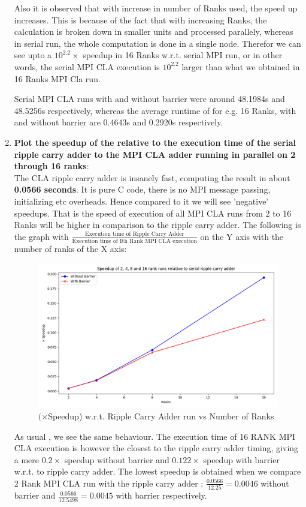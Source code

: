 \documentclass[a4paper,12 pt]{article}
\begin{document}
\begin{enumerate}
Also it is observed that with increase in number of Ranks used, the speed up increases. This is because of the fact that with increasing Ranks, the calculation is broken down in smaller units and processed parallely, whereas in serial run, the whole computation is done in a single node. Therefor we can see upto a $10^{2.2} \times$ speedup in 16 Ranks w.r.t. serial MPI run, or in other words, the serial MPI CLA execution is $10^{2.2}$ larger than what we obtained in 16 Ranks MPI Cla run.

Serial MPI CLA runs with and without barrier were around 48.1984s and 48.5256s respectively, whereas the average runtime of for e.g. 16 Ranks, with and without barrier are 0.4643s and 0.2920s respectively. 


\item \textbf{Plot the speedup of the relative to the execution time of the serial ripple carry adder
to the MPI CLA adder running in parallel on 2 through 16 ranks}:\\

The CLA ripple carry adder is insanely fast, computing the result in about \textbf{0.0566 seconds}. It is pure C code, there is no MPI message passing, initializing etc overheads. Hence compared to it we will see 'negative' speedups. That is the speed of execution of all MPI CLA runs from 2 to 16 Ranks will be higher in comparison to the ripple carry adder. The following is the graph with $\frac{\text{Execution time of Ripple Carry Adder}}{\text{Execution time of Ith Rank MPI CLA execution}}$ on the Y axis with the number of ranks of the X axis:

\begin{figure}[H]
	\centering
	\includegraphics[width=.8\linewidth]{Graphs/graph_3.png}
  \caption{$(\times $Speedup) w.r.t. Ripple Carry Adder run vs Number of Ranks}
\end{figure}

As usual , we see the same behaviour. The execution time of 16 RANK MPI CLA execution is however the closest to the ripple carry adder timing, giving a mere $0.2\times$ speedup without barrier and $0.122 \times$ speedup with barrier w.r.t. to ripple carry adder. The lowest speedup is obtained when we compare 2 Rank MPI CLA run with the ripple carry adder : $\frac{0.0566}{12.25} = 0.0046$ without barrier and $\frac{0.0566}{12.5498} = 0.0045$ with barrier respectively.


\end{enumerate}
\end{document}
